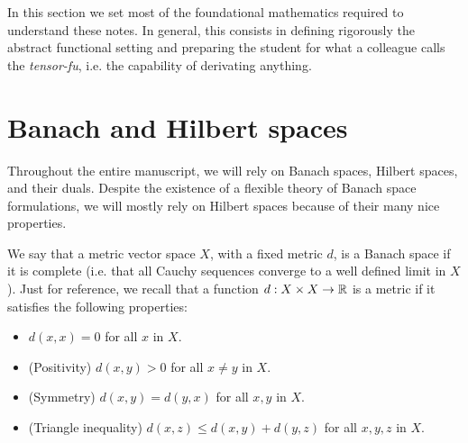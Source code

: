 In this section we set most of the foundational mathematics required to understand these notes. In general, this consists in defining rigorously the abstract functional setting and preparing the student for what a colleague calls the \emph{tensor-fu}, i.e. the capability of derivating anything. 

\section{Banach and Hilbert spaces}
Throughout the entire manuscript, we will rely on Banach spaces, Hilbert spaces, and their duals. Despite the existence of a flexible theory of Banach space formulations, we will mostly rely on Hilbert spaces because of their many nice properties. 

\begin{definition}
    We say that a metric vector space $X$, with a fixed metric $d$, is a Banach space if it is complete (i.e. that all Cauchy sequences converge to a well defined limit in $X$). Just for reference, we recall that a function $d:X\times X\to \mathbb{R}$ is a metric if it satisfies the following properties: 
    \begin{itemize}
        \item $d(x,x) = 0$ for all $x$ in $X$. 
        \item (Positivity) $d(x,y) > 0$ for all $x\neq y$ in $X$. 
        \item (Symmetry) $d(x,y) = d(y,x)$ for all $x,y$ in $X$. 
        \item (Triangle inequality) $d(x,z) \leq d(x,y) + d(y,z)$ for all $x,y,z$ in $X$. 
    \end{itemize}
\end{definition}

